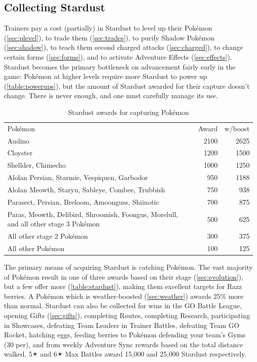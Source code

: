 \subsection{Collecting Stardust}
\label{subsec:getdust}
Trainers pay a cost (partially) in Stardust
  to level up their Pokémon (\autoref{sec:plevel}),
  to trade them (\autoref{sec:trades}),
  to purify Shadow Pokémon (\autoref{sec:shadow}),
  to teach them second charged attacks (\autoref{sec:charged}),
  to change certain forms (\autoref{sec:forms}),
  and to activate Adventure Effects (\autoref{sec:effects}).
Stardust becomes the primary bottleneck on advancement fairly early in the game:
  Pokémon at higher levels require more Stardust to power up (\autoref{table:powerups}),
  but the amount of Stardust awarded for their capture doesn't change.
There is never enough, and one must carefully manage its use.
\begin{table}[hb]
  \begin{centering}
    \begin{tabular}{p{}rr}
      Pokémon & Award & w/boost\\
      \Midrule
      Audino & 2100 & 2625\\
      Cloyster & 1200 & 1500\\
      Shellder, Chimecho & 1000 & 1250\\
      Alolan Persian, Starmie, Vespiquen, Garbodor & 950 & 1188\\
      Alolan Meowth, Staryu, Sableye, Combee, Trubbish & 750 & 938\\
      Parasect, Persian, Breloom, Amoonguss, Shiinotic & 700 & 875\\
      Paras, Meowth, Delibird, Shroomish, Foongus,\newline
      \hspace{\parindent}Morelull, and all other stage 3 Pokémon & 500 & 625\\
      All other stage 2 Pokémon & 300 & 375\\
      All other Pokémon & 100 & 125\\
    \end{tabular}
  \end{centering}
  \caption{Stardust awards for capturing Pokémon}
  \label{table:stardust}
\end{table}

The primary means of acquiring Stardust is catching Pokémon.
The vast majority of Pokémon result in one of three awards based on their stage
 (\autoref{sec:evolution}), but a few offer more (\autoref{table:stardust}),
 making them excellent targets for Razz berries.
A Pokémon which is weather-boosted (\autoref{sec:weather}) awards 25\% more than normal.
Stardust can also be collected for wins in the GO Battle League,
  opening Gifts (\autoref{sec:gifts}),
  completing Routes,
  completing Research,
  participating in Showcases,
  defeating Team Leaders in Trainer Battles,
  defeating Team GO Rocket,
  hatching eggs,
  feeding berries to Pokémon defending your team's Gyms (30 per),
  and from weekly Adventure Sync rewards based on the total distance walked.
5🟉 and 6🟉 Max Battles award 15,000 and 25,000 Stardust respectively.

